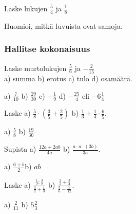 \begin{tehtavasivu}
\begin{tehtava}
Laske lukujen $\frac{5}{4}$ ja $\frac{1}{8}$ 
	\begin{alakohdat}
	\end{alakohdat}
Huomioi, mitkä luvuista ovat samoja.
	\begin{vastaus}
		\begin{alakohdat}
			\alakohta{$\frac{-11}{8}$}
			\alakohta{$8\frac{5}{4}=10$}
			\alakohta{$-\frac{11}{8}$}
			\alakohta{$-\frac{8}{11}$}
		\end{alakohdat}
		
	\end{vastaus}
\end{tehtava}

\subsubsection*{Hallitse kokonaisuus}

\begin{tehtava}
Laske murtolukujen $\frac{5}{6}$ ja $-\frac{2}{15}$\\ a) summa \qquad b) erotus \qquad c) tulo \qquad d) osamäärä.
\begin{vastaus}
a) $\frac{7}{10}$ \qquad b) $\frac{29}{30}$ \qquad c) $-\frac{1}{9}$ \qquad d) $-\frac{25}{4}$ eli $-6\frac{1}{4}$
\end{vastaus}
\end{tehtava}

\begin{tehtava} Laske
a) $\frac{5}{8}\cdot(\frac{3}{5}+\frac{2}{5})$ \qquad b) $\frac{1}{3}+\frac{1}{4}\cdot\frac{6}{5}$.
\begin{vastaus}
a) $\frac{5}{8}$ \qquad b) $\frac{19}{30}$
\end{vastaus}
\end{tehtava}

\begin{tehtava}
Supista \quad
a) $\frac{12a+2ab}{4a}$ \qquad b) $\frac{a\cdot a\cdot (3b)}{3a}$.
\begin{vastaus}
a) $\frac{6+b}{2}$\qquad b) $ab$
\end{vastaus}
\end{tehtava}

\begin{tehtava}Laske
a) $\frac{\frac{1}{2}:\frac{3}{2}}{\frac{3}{2}+\frac{1}{3}}$ \qquad b) $\frac{\frac{2}{3}+\frac{3}{4}}{\frac{5}{6}-\frac{7}{12}}$.
\begin{vastaus}
a) $\frac{2}{11}$ \qquad b) $5\frac{2}{3}$
\end{vastaus}
\end{tehtava}


\end{tehtavasivu}
